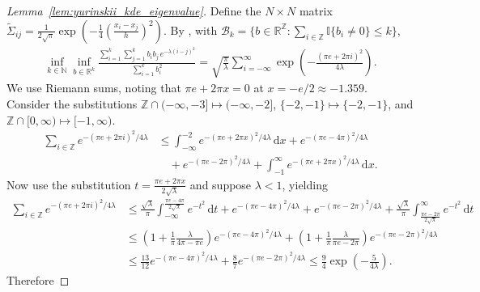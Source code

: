\documentclass[11pt,lof]{puthesis}
\newcommand{\N}{\ensuremath{\mathbb{N}}}
\newcommand{\R}{\ensuremath{\mathbb{R}}}
\newcommand{\I}{\ensuremath{\mathbb{I}}}
\newcommand{\Z}{\ensuremath{\mathbb{Z}}}
\newcommand{\cB}{\ensuremath{\mathcal{B}}}
\newcommand{\diff}[1]{\,\mathrm{d}#1}
\theoremstyle{break}
\theoremstyle{proof}
\newtheorem{proof}{Proof}
\begin{document}
\begin{proof}[Lemma~\ref{lem:yurinskii_kde_eigenvalue}]
  Define the $N \times N$ matrix
  $\tilde\Sigma_{i j} = \frac{1}{2 \sqrt \pi}
  \exp \left( - \frac{1}{4} \left( \frac{x_i-x_j}{h} \right)^2 \right)$.
  By \citet[Proposition~2.4,
  Proposition~2.5, and Equation~2.10]{baxter1994norm},
  with
  $\cB_k = \big\{b \in \R^\Z :
  \sum_{i \in \Z} \I\{b_i \neq 0\} \leq k \big\}$,
  \begin{align*}
    \inf_{k \in \N}
    \inf_{b \in \R^k}
    \frac{\sum_{i=1}^k \sum_{j=1}^k b_i b_j \, e^{-\lambda(i-j)^2}}
    {\sum_{i=1}^k b_i^2}
    =
    \sqrt{\frac{\pi}{\lambda}}
    \sum_{i=-\infty}^{\infty}
    \exp \left( - \frac{(\pi e + 2 \pi i)^2}{4 \lambda} \right).
  \end{align*}
  We use Riemann sums,
  noting that $\pi e + 2 \pi x = 0$ at
  $x = -e/2 \approx -1.359$.
  Consider the substitutions
  $\Z \cap (-\infty, -3] \mapsto (-\infty, -2]$,
  $\{-2, -1\} \mapsto \{-2, -1\}$, and
  $\Z \cap [0, \infty) \mapsto [-1, \infty)$.
  \begin{align*}
    \sum_{i \in \Z}
    e^{-(\pi e + 2 \pi i)^2 / 4 \lambda}
    &\leq
    \int_{-\infty}^{-2}
    e^{ - (\pi e + 2 \pi x)^2/4 \lambda}
    \diff x
    + e^{- (\pi e - 4 \pi)^2/4 \lambda} \\
    &\quad+
    e^{ - (\pi e - 2 \pi)^2 / 4 \lambda}
    + \int_{-1}^{\infty}
    e^{ -(\pi e + 2 \pi x)^2 / 4 \lambda}
    \diff x.
  \end{align*}
  Now use the substitution $t = \frac{\pi e + 2 \pi x}{2 \sqrt \lambda}$
  and suppose $\lambda < 1$, yielding
  \begin{align*}
    \sum_{i \in \Z}
    e^{-(\pi e + 2 \pi i)^2 / 4 \lambda}
    &\leq
    \frac{\sqrt \lambda}{\pi}
    \int_{-\infty}^{\frac{\pi e - 4 \pi}{2 \sqrt \lambda}}
    e^{-t^2}
    \diff t
    + e^{- (\pi e - 4 \pi)^2/4 \lambda}
    + e^{ - (\pi e - 2 \pi)^2 / 4 \lambda}
    + \frac{\sqrt \lambda}{\pi}
    \int_{\frac{\pi e - 2 \pi}{2 \sqrt \lambda}}^{\infty}
    e^{-t^2}
    \diff t \\
    &\leq
    \left( 1 + \frac{1}{\pi} \frac{\lambda}{4 \pi - \pi e} \right)
    e^{-(\pi e - 4 \pi)^2 / 4 \lambda}
    +
    \left( 1 + \frac{1}{\pi} \frac{\lambda}{\pi e - 2 \pi} \right)
    e^{- (\pi e - 2 \pi)^2 / 4 \lambda} \\
    &\leq
    \frac{13}{12}
    e^{-(\pi e - 4 \pi)^2 / 4 \lambda}
    +
    \frac{8}{7}
    e^{- (\pi e - 2 \pi)^2 / 4 \lambda}
    \leq
    \frac{9}{4}
    \exp \left( - \frac{5}{4 \lambda} \right).
  \end{align*}
  Therefore

\end{proof}
\end{document}
